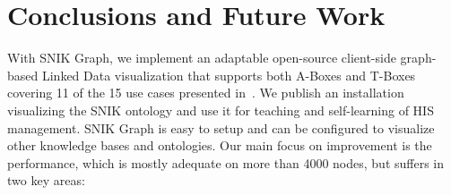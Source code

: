 \documentclass[conference]{IEEEtran}
\begin{document}
\section{Conclusions and Future Work}
With SNIK Graph, we implement an adaptable open-source client-side graph-based Linked Data visualization that supports both A-Boxes and T-Boxes covering 11 of the 15 use cases presented in~\cite{linkeddatavisualization}.
We publish an installation visualizing the SNIK ontology and use it for teaching and self-learning of HIS management.
SNIK Graph is easy to setup and can be configured to visualize other knowledge bases and ontologies.  
Our main focus on improvement is the performance, which is mostly adequate on more than 4000 nodes, but suffers in two key areas:



\end{document}
